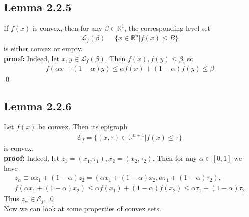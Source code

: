 \documentclass[12pt,a4paper]{article}
\begin{document}
	\subsection*{Lemma 2.2.5}\label{lem225}
	
	If $f(x)$ is convex, then for any $\beta \in \mathbb{R}^1$, the corresponding level set
	\begin{align*}
		\mathcal{L}_f(\beta) = \{x \in \mathbb{R}^n | f(x) \leq B\}
	\end{align*}
	is either convex or empty. \\
	\textbf{proof:} Indeed, let $x, y \in \mathcal{L}_f(\beta)$. Then $f(x), f(y) \leq \beta$, so
	\begin{align*}
		f(\alpha x + (1 - \alpha)y) \leq \alpha f(x) + (1 - \alpha)f(y) \leq \beta
	\end{align*}
	\qed 
	\subsection*{Lemma 2.2.6}\label{lem226}
	Let $f(x)$ be convex. Then its epigraph
	\begin{align*}
		\mathcal{E}_f = \{ (x, \tau) \in \mathbb{R}^{n+1} | f(x) \leq \tau\}
	\end{align*}
	is convex.  \\
	\textbf{proof:} Indeed, let $z_1 = (x_1, \tau_1), x_2 = (x_2, \tau_2)$. Then for any $\alpha \in [0,1]$ we have
	\begin{align*}
		z_\alpha \equiv \alpha z_1 + (1 - \alpha)z_2 = (\alpha x_1 + (1 - \alpha)x_2, \alpha \tau_1 + (1 - \alpha)\tau_2), \\
		f(\alpha x_1 + (1 - \alpha)x_2) \leq \alpha f(x_1) + (1 - \alpha)f(x_2) \leq \alpha \tau_1 + (1 - \alpha)\tau_2
	\end{align*}
	Thus $z_\alpha \in \mathcal{E}_f$. \qed \\
	Now we can look at some properties of convex sets.
\end{document}
